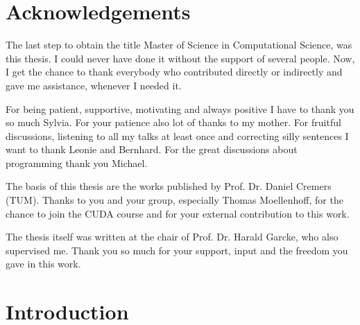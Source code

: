 \documentclass{scrreprt}
\begin{document}
\newpage

\chapter*{Acknowledgements} %
\label{cha:acknowledgements}
	
    The last step to obtain the title Master of Science in Computational Science, was this thesis. I could never have done it without the support of several people. Now, I get the chance to thank everybody who contributed directly or indirectly and gave me assistance, whenever I needed it.
    
    For being patient, supportive, motivating and always positive I have to thank you so much Sylvia. For your patience also lot of thanks to my mother. For fruitful discussions, listening to all my talks at least once and correcting silly sentences I want to thank Leonie and Bernhard. For the great discussions about programming thank you Michael.
    
    The basis of this thesis are the works published by Prof. Dr. Daniel Cremers (TUM). Thanks to you and your group, especially Thomas Moellenhoff, for the chance to join the CUDA course and for your external contribution to this work.
    
    The thesis itself was written at the chair of Prof. Dr. Harald Garcke, who also supervised me. Thank you so much for your support, input and the freedom you gave in this work.


\newpage

\tableofcontents
\listoftables
\listoffigures


\chapter{Introduction} %
\label{cha:introduction}
\end{document}
